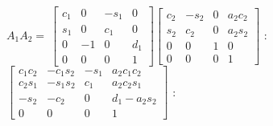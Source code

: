 \documentclass{article}
\begin{document}
\bigskip 

$A_{1}A_{2}=\ \left[ 
\begin{array}{cccc}
c_{1} & 0 & -s_{1} & 0 \\ 
s_{1} & 0 & c_{1} & 0 \\ 
0 & -1 & 0 & d_{1} \\ 
0 & 0 & 0 & 1%
\end{array}%
\right] \left[ 
\begin{array}{cccc}
c_{2} & -s_{2} & 0 & a_{2}c_{2} \\ 
s_{2} & c_{2} & 0 & a_{2}s_{2} \\ 
0 & 0 & 1 & 0 \\ 
0 & 0 & 0 & 1%
\end{array}%
\right] $ : $\left[ 
\begin{array}{cccc}
c_{1}c_{2} & -c_{1}s_{2} & -s_{1} & a_{2}c_{1}c_{2} \\ 
c_{2}s_{1} & -s_{1}s_{2} & c_{1} & a_{2}c_{2}s_{1} \\ 
-s_{2} & -c_{2} & 0 & d_{1}-a_{2}s_{2} \\ 
0 & 0 & 0 & 1%
\end{array}%
\right] \allowbreak $ : 

\bigskip 
\end{document}
